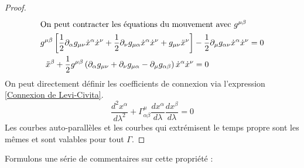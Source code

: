 \begin{proof}
\begin{align}
    \intertext{On peut contracter les équations du mouvement avec $g^{\mu \beta}$}
    g^{\mu \beta} \left[\frac{1}{2}\partial_{\alpha}g_{\mu \nu} \dot{x}^{\alpha}\dot{x}^{\nu} + \frac{1}{2}\partial_{\nu}g_{\mu \alpha}\dot{x}^{\alpha}\dot{x}^{\nu} + g_{\mu \nu}\ddot{x}^{\nu} \right]  &- \frac{1}{2}\partial_{\mu}g_{\alpha \nu}\dot{x}^{\alpha}\dot{x}^{\nu} = 0\\
    \ddot{x}^{\beta} + \frac{1}{2}g^{\mu \beta} \left(\partial_{\alpha}g_{\mu \nu} + \partial_{\nu}g_{\mu \alpha} - \partial_{\mu}g_{\alpha \beta}\right) \dot{x}^{\alpha}\dot{x}^{\nu} &= 0
\end{align}
On peut directement définir les coefficients de connexion via l'expression \ref{Connexion de Levi-Civita}.
\begin{equation}
    \frac{d^2x^{\alpha}}{d\lambda^2 } + \Gamma^{\mu}_{\alpha \beta} \frac{dx^{\alpha}}{d\lambda} \frac{dx^{\beta}}{d\lambda} = 0
\end{equation}
Les courbes auto-parallèles et les courbes qui extrémisent le temps propre sont les mêmes et sont valables pour tout $\Gamma$.
\end{proof}
Formulons une série de commentaires sur cette propriété :
